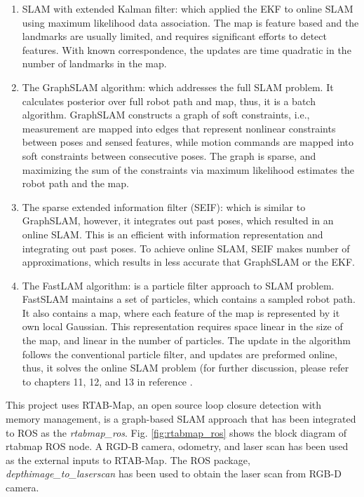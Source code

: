 \documentclass[10pt,journal,compsoc]{IEEEtran}
\begin{document}
\begin{enumerate} \item SLAM with extended Kalman filter: which applied the EKF to online SLAM using maximum likelihood data association. The map is feature based and the landmarks are usually limited, and requires significant efforts to detect features. With known correspondence, the updates are time quadratic in the number of landmarks in the map.  \item The GraphSLAM algorithm: which addresses the full SLAM problem. It calculates posterior over full robot path and map, thus, it is a batch algorithm. GraphSLAM constructs a graph of soft constraints, i.e., measurement are mapped into edges that represent nonlinear constraints between poses and sensed features, while motion commands are mapped into soft constraints between consecutive poses. The graph is sparse, and maximizing the sum of the constraints via maximum likelihood estimates the robot path and the map.  \item The sparse extended information filter (SEIF): which is similar to GraphSLAM, however, it integrates out past poses, which resulted in an online SLAM. This is an efficient with information representation and integrating out past poses. To achieve online SLAM, SEIF makes number of approximations, which results in less accurate that GraphSLAM or the EKF.  \item The FastLAM algorithm: is a particle filter approach to SLAM problem. FastSLAM maintains a set of particles, which contains a sampled robot path. It also contains a map, where each feature of the map is represented by it own local Gaussian. This representation requires space linear in the size of the map, and linear in the number of particles. The update in the algorithm follows the conventional particle filter, and updates are preformed online, thus, it solves the online SLAM problem (for further discussion, please refer to chapters 11, 12, and 13 in reference \cite{Thrun:2005:PR:1121596}.\end{enumerate} 

This project uses RTAB-Map, an open source loop closure detection with memory management, is a graph-based SLAM approach that has been integrated to ROS as the  \textit{rtabmap\_ros}. Fig. \ref{fig:rtabmap_ros} shows the block diagram of rtabmap ROS node.  A RGD-B camera, odometry, and laser scan has been used as the external inputs to RTAB-Map. The ROS package, \textit{depthimage\_to\_laserscan} has been used to obtain the laser scan from RGB-D camera.  
\end{document}
